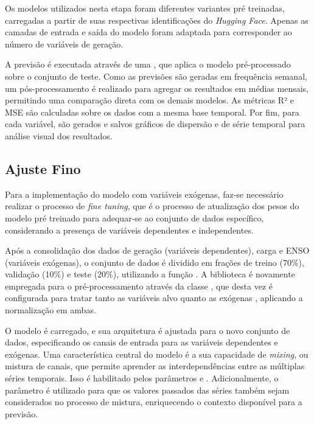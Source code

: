 Os modelos  utilizados nesta etapa foram diferentes variantes pré treinadas, carregadas a partir
de suas respectivas identificações do \textit{Hugging Face}. Apenas as camadas de entrada e saída do modelo foram adaptada 
para corresponder ao número de variáveis de geração.

A previsão é executada através de uma , que aplica o modelo pré-processado sobre o conjunto 
de teste. Como as previsões são geradas em frequência semanal, um pós-processamento é realizado para agregar os resultados em 
médias mensais, permitindo uma comparação direta com os demais modelos. As métricas R² e MSE são calculadas sobre os dados 
com a mesma base temporal. Por fim, para cada variável, são gerados e salvos gráficos de dispersão e de série temporal para 
análise visual dos resultados.


\subsection{Ajuste Fino} %
Para a implementação do modelo com variáveis exógenas, faz-se necessário realizar o processo de \textit{fine tuning}, que 
é o processo de atualização dos pesos do modelo pré treinado para adequar-se ao conjunto de dados específico, considerando
a presença de variáveis dependentes e independentes.

Após a consolidação dos dados de geração (variáveis dependentes), carga e ENSO (variáveis exógenas), o conjunto de dados é dividido em frações de treino (70\%), validação 
(10\%) e teste (20\%), utilizando a função . A biblioteca  é novamente empregada 
para o pré-processamento através da classe , que desta vez é configurada para tratar tanto as variáveis 
alvo  quanto as exógenas , aplicando a normalização  em ambas.

O modelo  é carregado, e sua arquitetura é ajustada para o novo conjunto de dados, especificando 
os canais de entrada para as variáveis dependentes e exógenas. Uma característica central do modelo é a sua capacidade de 
\textit{mixing}, ou mistura de canais, que permite aprender as interdependências entre as múltiplas séries temporais. Isso é 
habilitado pelos parâmetros  e . Adicionalmente, 
o parâmetro  é utilizado para que os valores passados das séries também sejam considerados no processo 
de mistura, enriquecendo o contexto disponível para a previsão.


